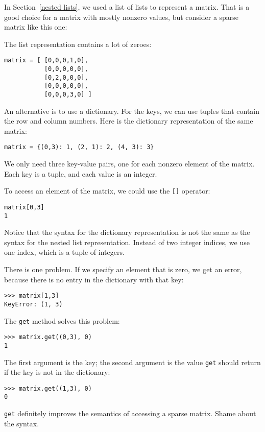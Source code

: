 In Section~\ref{nested lists}, we used a list of lists to represent a
matrix.  That is a good choice for a matrix with mostly nonzero
values, but consider a sparse matrix like this one:

\beforefig
\centerline{}
\afterfig

The list representation contains a lot of zeroes:

\beforeverb
\begin{verbatim}
matrix = [ [0,0,0,1,0],
           [0,0,0,0,0],
           [0,2,0,0,0],
           [0,0,0,0,0],
           [0,0,0,3,0] ]
\end{verbatim}
\afterverb
%
An alternative is to use a dictionary.
For the keys, we can use tuples that contain the row and column
numbers.  Here is the dictionary representation of the same matrix:

\beforeverb
\begin{verbatim}
matrix = {(0,3): 1, (2, 1): 2, (4, 3): 3}
\end{verbatim}
\afterverb
%
We only need three key-value pairs, one for each nonzero element of the
matrix.  Each key is a tuple, and each value is an integer.

To access an element of the matrix, we could use the {\tt []}
operator:

\beforeverb
\begin{verbatim}
matrix[0,3]
1
\end{verbatim}
\afterverb
%
Notice that the syntax for the dictionary representation is not the
same as the syntax for the nested list representation.  Instead of
two integer indices, we use one index, which is a tuple of integers.

There is one problem.
If we specify an element that is zero, we get an
error, because there is no entry in the dictionary with that key:


\beforeverb
\begin{verbatim}
>>> matrix[1,3]
KeyError: (1, 3)
\end{verbatim}
\afterverb
%
The {\tt get} method solves this problem:

\beforeverb
\begin{verbatim}
>>> matrix.get((0,3), 0)
1
\end{verbatim}
\afterverb
%
The first argument is the key; the second argument is the value
{\tt get} should return if the key is not in the dictionary:

\beforeverb
\begin{verbatim}
>>> matrix.get((1,3), 0)
0
\end{verbatim}
\afterverb
%
{\tt get} definitely improves the semantics of accessing
a sparse matrix.  Shame about the syntax.


